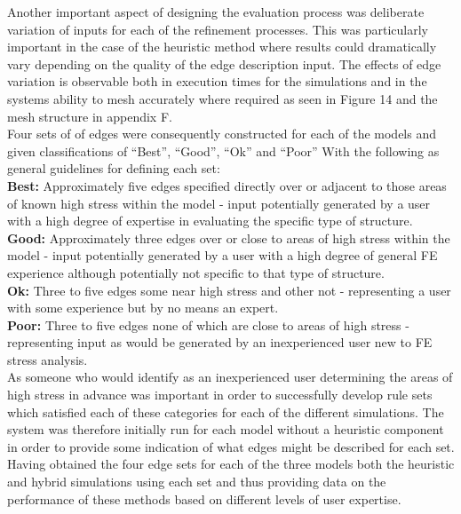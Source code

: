 \noindent
Another important aspect of designing the evaluation process was deliberate  variation of inputs for each of the refinement processes. This was particularly important in the case of the heuristic method where results could dramatically vary depending on the quality of the edge description input. The effects of edge variation is observable both in execution times for the simulations and in the systems ability to mesh accurately where required as seen in Figure 14 and the mesh structure in appendix F. \\ 

\noindent
Four sets of of edges were consequently constructed for each of the models and given classifications of ``Best'', ``Good'', ``Ok'' and ``Poor'' With the following as general guidelines for defining each set: \\

\noindent
\textbf{Best: } Approximately five edges specified directly over or adjacent to those areas of known high stress within the model - input potentially generated by a user with a high degree of expertise in evaluating the specific type of structure. \\ 

\noindent
\textbf{Good: } Approximately three edges over or close to areas of high stress within the model - input potentially generated by a user with a high degree of general FE experience although potentially not specific to that type of structure. \\ 

\noindent
\textbf{Ok: } Three to five edges some near high stress and other not - representing a user with some experience but by no means an expert. \\ 

\noindent
\textbf{Poor: } Three to five edges none of which are close to areas of high stress - representing input as would be generated by an inexperienced user new to FE stress analysis. \\ 

\noindent
As someone who would identify as an inexperienced user determining the areas of high stress in advance was important in order to successfully develop rule sets which satisfied each of these categories  for each of the different simulations. The system was therefore initially run for each model without a heuristic component in order to provide some indication of what edges might be described for each set. Having obtained the four edge sets for each of the three models both the heuristic and hybrid simulations using each set and thus providing data on the performance of these methods based on different levels of user expertise. \\

